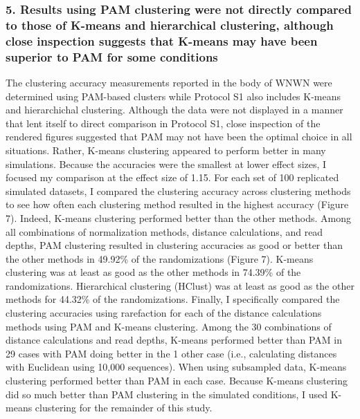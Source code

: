 \documentclass[
]{article}
\begin{document}
\hypertarget{results-using-pam-clustering-were-not-directly-compared-to-those-of-k-means-and-hierarchical-clustering-although-close-inspection-suggests-that-k-means-may-have-been-superior-to-pam-for-some-conditions}{%
\subsubsection{5. Results using PAM clustering were not directly
compared to those of K-means and hierarchical clustering, although close
inspection suggests that K-means may have been superior to PAM for some
conditions}\label{results-using-pam-clustering-were-not-directly-compared-to-those-of-k-means-and-hierarchical-clustering-although-close-inspection-suggests-that-k-means-may-have-been-superior-to-pam-for-some-conditions}}

The clustering accuracy measurements reported in the body of WNWN were
determined using PAM-based clusters while Protocol S1 also includes
K-means and hierarchichal clustering. Although the data were not
displayed in a manner that lent itself to direct comparison in Protocol
S1, close inspection of the rendered figures suggested that PAM may not
have been the optimal choice in all situations. Rather, K-means
clustering appeared to perform better in many simulations. Because the
accuracies were the smallest at lower effect sizes, I focused my
comparison at the effect size of 1.15. For each set of 100 replicated
simulated datasets, I compared the clustering accuracy across clustering
methods to see how often each clustering method resulted in the highest
accuracy (Figure 7). Indeed, K-means clustering performed better than
the other methods. Among all combinations of normalization methods,
distance calculations, and read depths, PAM clustering resulted in
clustering accuracies as good or better than the other methods in
49.92\% of the randomizations (Figure 7). K-means clustering was at
least as good as the other methods in 74.39\% of the randomizations.
Hierarchical clustering (HClust) was at least as good as the other
methods for 44.32\% of the randomizations. Finally, I specifically
compared the clustering accuracies using rarefaction for each of the
distance calculations methods using PAM and K-means clustering. Among
the 30 combinations of distance calculations and read depths, K-means
performed better than PAM in 29 cases with PAM doing better in the 1
other case (i.e., calculating distances with Euclidean using 10,000
sequences). When using subsampled data, K-means clustering performed
better than PAM in each case. Because K-means clustering did so much
better than PAM clustering in the simulated conditions, I used K-means
clustering for the remainder of this study.
\end{document}
